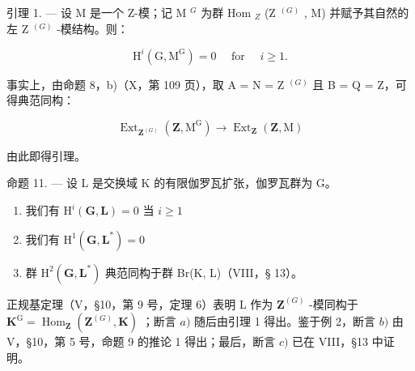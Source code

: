 引理 1. --- 设 M 是一个 Z-模；记 M \(^{G}\) 为群 Hom \(_{Z}\) (Z \(^{(G)}\) , M) 并赋予其自然的左 Z \(^{(G)}\) -模结构。则：

\[
\mathrm{H} ^ {i} (\mathrm{G}, \mathrm{M} ^ {\mathrm{G}}) = 0 \quad \text { for } \quad i \geqslant 1.
\]

事实上，由命题 8，b)（X，第 109 页），取 A = N = Z \(^{(G)}\) 且 B = Q = Z，可得典范同构：

\[
\operatorname{Ext} _ {\mathbf {Z} ^ {(G)}} \left(\mathbf {Z}, \mathrm{M} ^ {\mathrm{G}}\right)\rightarrow \operatorname{Ext} _ {\mathbf {Z}} (\mathbf {Z}, \mathrm{M})
\]

由此即得引理。

命题 11. --- 设 L 是交换域 K 的有限伽罗瓦扩张，伽罗瓦群为 G。

\begin{enumerate}
\def\labelenumi{\alph{enumi})}
\item
  我们有 \(\mathrm{H}^i (\mathbf{G},\mathbf{L}) = 0\) 当 \(i\geqslant 1\)
\item
  我们有 \(\mathrm{H}^1 (\mathbf{G},\mathbf{L}^*) = 0\)
\item
  群 \(\mathrm{H}^2 (\mathbf{G},\mathbf{L}^*)\) 典范同构于群 Br(K, L)（VIII，§ 13）。
\end{enumerate}

正规基定理（V，§10，第 9 号，定理 6）表明 L 作为 \(\mathbf{Z}^{(G)}\) -模同构于 \(\mathbf{K}^{\mathrm{G}} = \operatorname{Hom}_{\mathbf{Z}}(\mathbf{Z}^{(G)}, \mathbf{K})\) ；断言 \(a)\) 随后由引理 1 得出。鉴于例 2，断言 \(b)\) 由 V，§10，第 5 号，命题 9 的推论 1 得出；最后，断言 \(c)\) 已在 VIII，§13 中证明。

